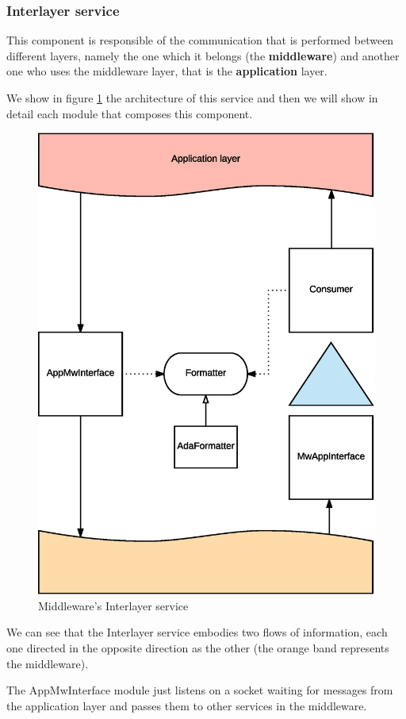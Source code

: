 \subsubsection{Interlayer service}

This component is responsible of the communication that is performed between
different layers, namely the one which it belongs (the \textbf{middleware}) and
another one who uses the middleware layer, that is the \textbf{application}
layer.

We show in figure \ref{fig:mw-interlayer} the architecture of this service and
then we will show in detail each module that composes this component.

\begin{figure}[H]
  \centering
  \includegraphics[width=.8\columnwidth]{images/solution/mw/int/architect.eps}
  \caption{Middleware's Interlayer service}
  \label{fig:mw-interlayer}
\end{figure}

We can see that the Interlayer service embodies two flows of information, each
one directed in the opposite direction as the other (the orange band represents
the middleware).

The AppMwInterface module just listens on a socket waiting for messages from
the application layer and passes them to other services in the middleware.

